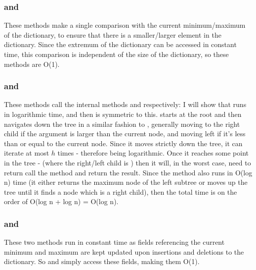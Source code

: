 \subsubsection{ and }
These methods make a single comparison with the current minimum/maximum of the dictionary, to ensure that there is a smaller/larger element in the dictionary. Since the extremum of the dictionary can be accessed in constant time, this comparison is independent of the size of the dictionary, so these methods are O(1).

\subsubsection{ and }
These methods call the internal methods  and  respectively: I will show that  runs in logarithmic time, and then  is symmetric to this.  starts at the root and then navigates down the tree in a similar fashion to , generally moving to the right child if the argument is larger than the current node, and moving left if it's less than or equal to the current node. Since it moves strictly down the tree, it can iterate at most $h$ times - therefore being logarithmic.
Once it reaches some point in the tree - (where the right/left child is ) then it will, in the worst case, need to return call the  method and return the result. Since the  method also runs in O(log n) time (it either returns the maximum node of the left subtree or moves up the tree until it finds a node which is a right child), then the total time is on the order of O(log n + log n) = O(log n).

\subsubsection{ and }
These two methods run in constant time as fields referencing the current minimum and maximum are kept updated upon insertions and deletions to the dictionary. So  and  simply access these fields, making them O(1).

\subsubsection{}

